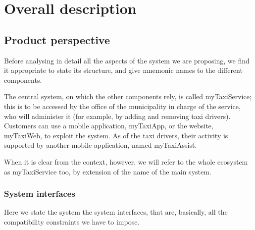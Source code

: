 \chapter{Overall description}


\section{Product perspective}\label{sec:productPerspective}
Before analysing in detail all the aspects of the system we are proposing, we find it appropriate to state its structure, and give mnemonic names to the different components. 

The central system, on which the other components rely, is called myTaxiService; this is to be accessed by the office of the municipality in charge of the service, who will administer it (for example, by adding and removing taxi drivers). Customers can use a mobile application, myTaxiApp, or the website, myTaxiWeb, to exploit the system. As of the taxi drivers, their activity is supported by another mobile application, named myTaxiAssist. 

When it is clear from the context, however, we will refer to the whole ecosystem as myTaxiService too, by extension of the name of the main system. 


\subsection{System interfaces}\label{subsec:systemInterfaces}
Here we state the system the system interfaces, that are, basically, all the compatibility constraints we have to impose.


